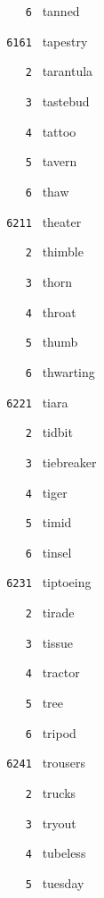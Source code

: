 \documentclass[11pt]{article}
\begin{document}
\begin{multicols}{6}
\noindent \texttt{ \ \ \ 6 } tanned  \par
\vspace{3mm}
\noindent \texttt{ 6161 } tapestry  \par
\noindent \texttt{ \ \ \ 2 } tarantula  \par
\noindent \texttt{ \ \ \ 3 } tastebud  \par
\noindent \texttt{ \ \ \ 4 } tattoo  \par
\noindent \texttt{ \ \ \ 5 } tavern  \par
\noindent \texttt{ \ \ \ 6 } thaw  \par
\noindent \texttt{ 6211 } theater  \par
\noindent \texttt{ \ \ \ 2 } thimble  \par
\noindent \texttt{ \ \ \ 3 } thorn  \par
\noindent \texttt{ \ \ \ 4 } throat  \par
\noindent \texttt{ \ \ \ 5 } thumb  \par
\noindent \texttt{ \ \ \ 6 } thwarting  \par
\vspace{3mm}
\noindent \texttt{ 6221 } tiara  \par
\noindent \texttt{ \ \ \ 2 } tidbit  \par
\noindent \texttt{ \ \ \ 3 } tiebreaker  \par
\noindent \texttt{ \ \ \ 4 } tiger  \par
\noindent \texttt{ \ \ \ 5 } timid  \par
\noindent \texttt{ \ \ \ 6 } tinsel  \par
\vspace{3mm}
\noindent \texttt{ 6231 } tiptoeing  \par
\noindent \texttt{ \ \ \ 2 } tirade  \par
\noindent \texttt{ \ \ \ 3 } tissue  \par
\noindent \texttt{ \ \ \ 4 } tractor  \par
\noindent \texttt{ \ \ \ 5 } tree  \par
\noindent \texttt{ \ \ \ 6 } tripod  \par
\vspace{3mm}
\noindent \texttt{ 6241 } trousers  \par
\noindent \texttt{ \ \ \ 2 } trucks  \par
\noindent \texttt{ \ \ \ 3 } tryout  \par
\noindent \texttt{ \ \ \ 4 } tubeless  \par
\noindent \texttt{ \ \ \ 5 } tuesday  \par

\end{multicols}
\end{document}
